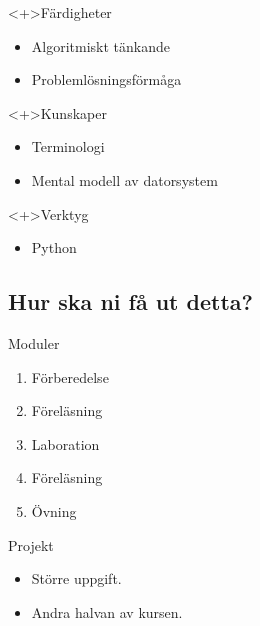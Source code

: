 \begin{frame}
  \begin{block}<+>{Färdigheter}
    \begin{itemize}
      \item Algoritmiskt tänkande
      \item Problemlösningsförmåga
    \end{itemize}
  \end{block}

  \begin{block}<+>{Kunskaper}
    \begin{itemize}
      \item Terminologi
      \item Mental modell av datorsystem
    \end{itemize}
  \end{block}

  \begin{block}<+>{Verktyg}
    \begin{itemize}
      \item Python
    \end{itemize}
  \end{block}
\end{frame}

\subsection{Hur ska ni få ut detta?}

\begin{frame}
  \begin{block}{Moduler}
    \begin{enumerate}
      \item Förberedelse
      \item Föreläsning
      \item Laboration
      \item Föreläsning
      \item Övning
    \end{enumerate}
  \end{block}

  \pause

  \begin{block}{Projekt}
    \begin{itemize}
      \item Större uppgift.
      \item Andra halvan av kursen.
    \end{itemize}
  \end{block}
\end{frame}

